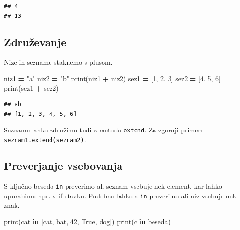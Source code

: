 \documentclass[
]{report}
\newenvironment{Shaded}{\begin{snugshade}}{\end{snugshade}}
\newcommand{\BuiltInTok}[1]{#1}
\newcommand{\DecValTok}[1]{\textcolor[rgb]{0.00,0.00,0.81}{#1}}
\newcommand{\KeywordTok}[1]{\textcolor[rgb]{0.13,0.29,0.53}{\textbf{#1}}}
\newcommand{\NormalTok}[1]{#1}
\newcommand{\OperatorTok}[1]{\textcolor[rgb]{0.81,0.36,0.00}{\textbf{#1}}}
\newcommand{\StringTok}[1]{\textcolor[rgb]{0.31,0.60,0.02}{#1}}
\newcommand{\VariableTok}[1]{\textcolor[rgb]{0.00,0.00,0.00}{#1}}
\begin{document}
\begin{verbatim}
## 4
## 13
\end{verbatim}

\hypertarget{zdruux17eevanje}{%
\subsection{Združevanje}\label{zdruux17eevanje}}

Nize in sezname staknemo s plusom.

\begin{Shaded}
\begin{Highlighting}[]
\NormalTok{niz1 }\OperatorTok{=} \StringTok{"a"}
\NormalTok{niz2 }\OperatorTok{=} \StringTok{"b"}
\BuiltInTok{print}\NormalTok{(niz1 }\OperatorTok{+}\NormalTok{ niz2)}
\NormalTok{sez1 }\OperatorTok{=}\NormalTok{ [}\DecValTok{1}\NormalTok{, }\DecValTok{2}\NormalTok{, }\DecValTok{3}\NormalTok{]}
\NormalTok{sez2 }\OperatorTok{=}\NormalTok{ [}\DecValTok{4}\NormalTok{, }\DecValTok{5}\NormalTok{, }\DecValTok{6}\NormalTok{]}
\BuiltInTok{print}\NormalTok{(sez1 }\OperatorTok{+}\NormalTok{ sez2)}
\end{Highlighting}
\end{Shaded}

\begin{verbatim}
## ab
## [1, 2, 3, 4, 5, 6]
\end{verbatim}

Sezname lahko združimo tudi z metodo \texttt{extend}. Za zgornji primer: \texttt{seznam1.extend(seznam2)}.

\hypertarget{preverjanje-vsebovanja}{%
\subsection{Preverjanje vsebovanja}\label{preverjanje-vsebovanja}}

S ključno besedo \texttt{in} preverimo ali seznam vsebuje nek element, kar lahko uporabimo npr. v if stavku. Podobno lahko z \texttt{in} preverimo ali niz vsebuje nek znak.

\begin{Shaded}
\begin{Highlighting}[]
\BuiltInTok{print}\NormalTok{(}\StringTok{\textquotesingle{}cat\textquotesingle{}} \KeywordTok{in}\NormalTok{ [}\StringTok{\textquotesingle{}cat\textquotesingle{}}\NormalTok{, }\StringTok{\textquotesingle{}bat\textquotesingle{}}\NormalTok{, }\DecValTok{42}\NormalTok{, }\VariableTok{True}\NormalTok{, }\StringTok{\textquotesingle{}dog\textquotesingle{}}\NormalTok{])}
\BuiltInTok{print}\NormalTok{(}\StringTok{\textquotesingle{}c\textquotesingle{}} \KeywordTok{in} \StringTok{\textquotesingle{}beseda\textquotesingle{}}\NormalTok{)}
\end{Highlighting}
\end{Shaded}
\end{document}
